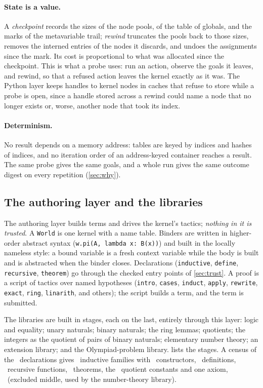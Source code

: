 \paragraph{State is a value.}
A \emph{checkpoint} records the sizes of the node pools, of the table of globals, and the marks of the metavariable trail; \emph{rewind} truncates the pools back to those sizes, removes the interned entries of the nodes it discards, and undoes the assignments since the mark.
Its cost is proportional to what was allocated since the checkpoint.
This is what a probe uses: run an action, observe the goals it leaves, and rewind, so that a refused action leaves the kernel exactly as it was.
The Python layer keeps handles to kernel nodes in caches that refuse to store while a probe is open, since a handle stored across a rewind could name a node that no longer exists or, worse, another node that took its index.

\paragraph{Determinism.}
No result depends on a memory address: tables are keyed by indices and hashes of indices, and no iteration order of an address-keyed container reaches a result.
The same probe gives the same goals, and a whole run gives the same outcome digest on every repetition (\cref{sec:why}).

\subsection{The authoring layer and the libraries}\label{sec:authoring}

The authoring layer builds terms and drives the kernel's tactics; \emph{nothing in it is trusted}.
A \texttt{World} is one kernel with a name table.
Binders are written in higher-order abstract syntax (\texttt{w.pi(A, lambda x: B(x))}) and built in the locally nameless style: a bound variable is a fresh context variable while the body is built and is abstracted when the binder closes.
Declarations (\texttt{inductive}, \texttt{define}, \texttt{recursive}, \texttt{theorem}) go through the checked entry points of \cref{sec:trust}.
A proof is a script of tactics over named hypotheses (\texttt{intro}, \texttt{cases}, \texttt{induct}, \texttt{apply}, \texttt{rewrite}, \texttt{exact}, \texttt{ring}, \texttt{linarith}, and others); the script builds a term, and the term is submitted.

The libraries are built in stages, each on the last, entirely through this layer: logic and equality; unary naturals; binary naturals; the ring lemmas; quotients; the integers as the quotient of pairs of binary naturals; elementary number theory; an extension library; and the Olympiad-problem library.
 lists the stages.
A census of the \libGlobals\ declarations gives \censusInd\ inductive families with \censusCtor\ constructors, \censusDef\ definitions, \censusRec\ recursive functions, \censusThm\ theorems, the \censusQuot\ quotient constants and one axiom, \censusAxiomName\ (excluded middle, used by the number-theory library).

